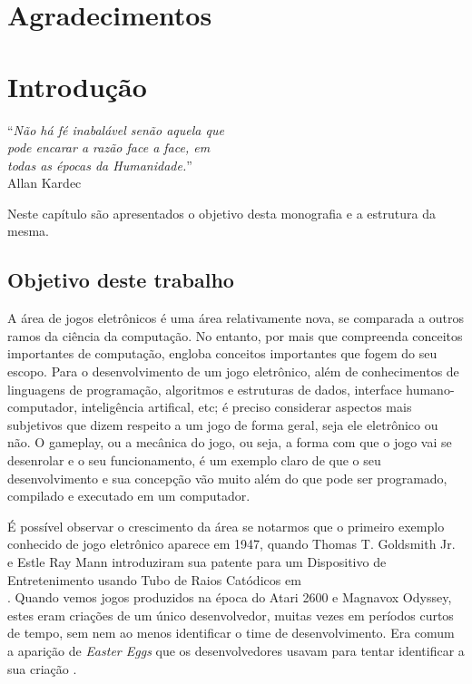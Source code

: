 \documentclass[brazil]{abnt}
\begin{document}
\chapter*{Agradecimentos}

\tableofcontents{}
\listoffigures
\listoftables

\chapter{Introdução\label{cap:introducao}}

\vfill{}
\begin{flushright}{}``\emph{Não há fé inabalável senão aquela que}\\
\emph{pode encarar a razão face a face, em}\\
\emph{todas as épocas da Humanidade.}''\\
{\small Allan Kardec}\end{flushright}{\small \par}
\vfill{}

Neste capítulo são apresentados o objetivo desta monografia e a estrutura
da mesma.
\newpage


\section{Objetivo deste trabalho}

A área de jogos eletrônicos é uma área relativamente nova, se comparada a outros ramos da ciência da computação. No entanto, por mais que compreenda conceitos importantes de computação, engloba conceitos importantes que fogem do seu escopo. Para o desenvolvimento de um jogo eletrônico, além de conhecimentos de linguagens de programação, algoritmos e estruturas de dados, interface humano-computador, inteligência artifical, etc; é preciso considerar aspectos mais subjetivos que dizem respeito a um jogo de forma geral, seja ele eletrônico ou não. O gameplay, ou a mecânica do jogo, ou seja, a forma com que o jogo vai se desenrolar e o seu funcionamento, é um exemplo claro de que o seu desenvolvimento e sua concepção vão muito além do que pode ser programado, compilado e executado em um computador.

É possível observar o crescimento da área se notarmos que o primeiro exemplo conhecido de jogo eletrônico aparece em 1947, quando Thomas T. Goldsmith Jr. e Estle Ray Mann introduziram sua patente para um Dispositivo de Entretenimento usando Tubo de Raios Catódicos em \\\cite{2455992}. Quando vemos jogos produzidos na época do Atari 2600 e Magnavox Odyssey, estes eram criações de um único desenvolvedor, muitas vezes em períodos curtos de tempo, sem nem ao menos identificar o time de desenvolvimento. Era comum a aparição de \textit{Easter Eggs} que os desenvolvedores usavam para tentar identificar a sua criação \cite{PrimeiroDevName}.
\end{document}
